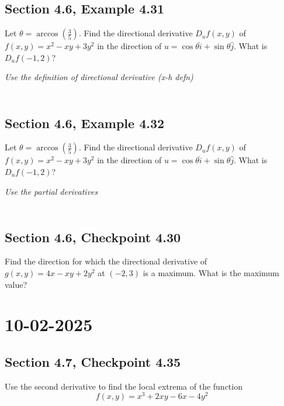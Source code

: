 \documentclass[]{mangos-musings}
\begin{document}
\newpage
\subsection{Section 4.6, Example 4.31}
Let $\theta = \arccos (\frac{3}{5})$. Find the directional derivative $D_u f(x, y)$ of $f(x, y) = x^2 - xy + 3y^2$ in the direction of $u = \cos \theta \hat{i} + \sin\theta\hat{j}$. What is $D_u f(-1, 2)$?

\textit{Use the definition of directional derivative (x-h defn)}
\begin{align*}
  \\ \\ \\
\end{align*}

\subsection{Section 4.6, Example 4.32}
Let $\theta = \arccos (\frac{3}{5})$. Find the directional derivative $D_u f(x, y)$ of $f(x, y) = x^2 - xy + 3y^2$ in the direction of $u = \cos \theta \hat{i} + \sin\theta\hat{j}$. What is $D_u f(-1, 2)$?

\textit{Use the partial derivatives}
\begin{align*}
  \\ \\ \\
\end{align*}

\subsection{Section 4.6, Checkpoint 4.30}
Find the direction for which the directional derivative of $g(x, y) = 4x - xy + 2y^2$ at $(-2, 3)$ is a maximum. What is the maximum value?


\newpage
\section{10-02-2025}
\subsection{Section 4.7, Checkpoint 4.35}
Use the second derivative to find the local extrema of the function 
\[f(x, y) = x^3 + 2xy - 6x - 4y^2\]
\begin{align*}
  \\ \\ \\
\end{align*}
\end{document}
